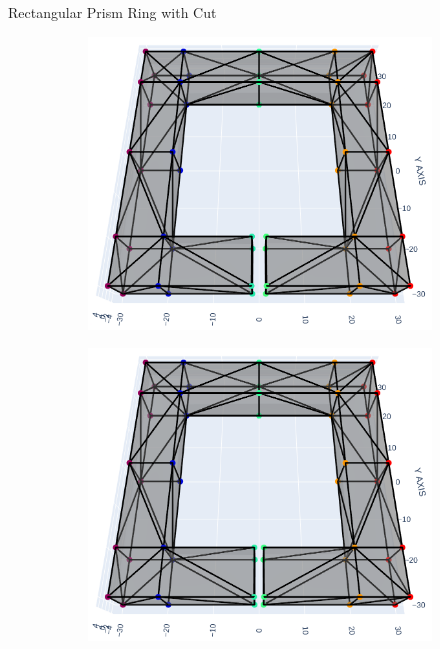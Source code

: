 \documentclass[xcolor=dvipsnames, aspectratio=169]{beamer}
\begin{document}
\begin{frame}{Rectangular Prism Ring with Cut}
\begin{figure}
\begin{subfigure}[b]{0.15\textwidth}
\includegraphics[width=\linewidth]{Final Run, (rect prism ring 03 mm cut) meshpy plotly screenshot.png}
\end{subfigure}
\begin{subfigure}[b]{0.15\textwidth}
\includegraphics[width=\linewidth]{Final Run, (rect prism ring 02 mm cut) meshpy plotly screenshot.png}
\end{subfigure}
\begin{subfigure}[b]{0.15\textwidth}

\end{subfigure}
\end{figure}
\end{frame}
\end{document}
